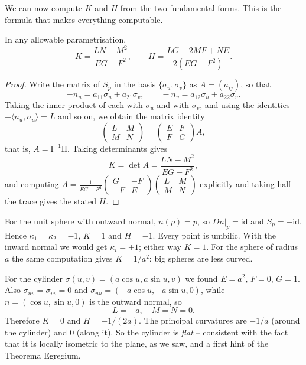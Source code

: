 We can now compute $K$ and $H$ from the two fundamental forms. This is the formula that makes everything computable.

\begin{proposition}
    In any allowable parametrisation,
    $$
    K = \frac{LN - M^2}{EG - F^2}, \qquad H = \frac{LG - 2MF + NE}{2(EG-F^2)}.
    $$
\end{proposition}
\begin{proof}
    Write the matrix of $S_p$ in the basis $\{\sigma_u, \sigma_v\}$ as $A = (a_{ij})$, so that
    $$
    -n_u = a_{11}\sigma_u + a_{21}\sigma_v, \qquad -n_v = a_{12}\sigma_u + a_{22}\sigma_v.
    $$
    Taking the inner product of each with $\sigma_u$ and with $\sigma_v$, and using the identities $-\langle n_u, \sigma_u\rangle = L$ and so on, we obtain the matrix identity
    $$
    \begin{pmatrix} L & M \\ M & N\end{pmatrix} = \begin{pmatrix} E & F \\ F & G\end{pmatrix} A,
    $$
    that is, $A = \mathrm{I}^{-1}\mathrm{II}$. Taking determinants gives
    $$
    K = \det A = \frac{LN-M^2}{EG-F^2},
    $$
    and computing $A = \frac{1}{EG-F^2}\begin{pmatrix} G & -F \\ -F & E\end{pmatrix}\begin{pmatrix} L & M \\ M & N \end{pmatrix}$ explicitly and taking half the trace gives the stated $H$.
\end{proof}

\begin{example}
    For the unit sphere with outward normal, $n(p) = p$, so $\left.Dn\right|_p = \mathrm{id}$ and $S_p = -\mathrm{id}$. Hence $\kappa_1 = \kappa_2 = -1$, $K = 1$ and $H = -1$. Every point is umbilic. With the inward normal we would get $\kappa_i = +1$; either way $K = 1$. For the sphere of radius $a$ the same computation gives $K = 1/a^2$: big spheres are less curved.
\end{example}

\begin{example}
    For the cylinder $\sigma(u,v) = (a\cos u, a\sin u, v)$ we found $E = a^2$, $F = 0$, $G=1$. Also $\sigma_{uv} = \sigma_{vv} = 0$ and $\sigma_{uu} = (-a\cos u, -a\sin u, 0)$, while $n = (\cos u, \sin u, 0)$ is the outward normal, so
    $$
    L = -a, \quad M = N = 0.
    $$
    Therefore $K = 0$ and $H = -1/(2a)$. The principal curvatures are $-1/a$ (around the cylinder) and $0$ (along it). So the cylinder is \emph{flat} -- consistent with the fact that it is locally isometric to the plane, as we saw, and a first hint of the Theorema Egregium.
\end{example}

